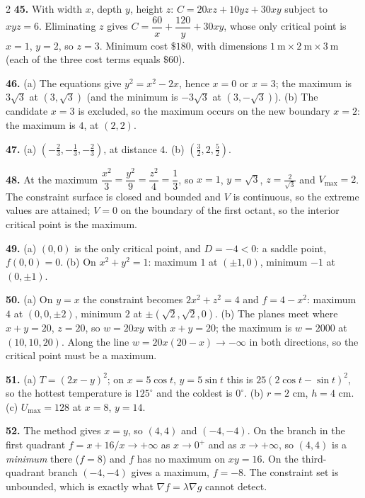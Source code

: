 \documentclass[11pt,oneside]{article}
\newcommand{\grad}{\nabla}
\begin{document}
{\begin{multicols}{2}
\textbf{45.} With width $x$, depth $y$, height $z$: $C=20xz+10yz+30xy$ subject to $xyz=6$.
Eliminating $z$ gives $C=\dfrac{60}{x}+\dfrac{120}{y}+30xy$, whose only critical point is
$x=1$, $y=2$, so $z=3$. Minimum cost $\$180$, with dimensions
$1\ \text{m}\times2\ \text{m}\times3\ \text{m}$ (each of the three cost terms equals $\$60$).

\textbf{46.} (a) The equations give $y^{2}=x^{2}-2x$, hence $x=0$ or $x=3$; the maximum is
$3\sqrt3$ at $\left(3,\sqrt3\right)$ (and the minimum is $-3\sqrt3$ at
$\left(3,-\sqrt3\right)$).\quad
(b) The candidate $x=3$ is excluded, so the maximum occurs on the new boundary $x=2$: the
maximum is $4$, at $(2,2)$.

\textbf{47.} (a) $\left(-\tfrac23,-\tfrac13,-\tfrac23\right)$, at distance $4$.\quad
(b) $\left(\tfrac32,2,\tfrac52\right)$.

\textbf{48.} At the maximum $\dfrac{x^{2}}{3}=\dfrac{y^{2}}{9}=\dfrac{z^{2}}{4}=\dfrac13$, so
$x=1$, $y=\sqrt3$, $z=\tfrac{2}{\sqrt3}$ and $V_{\max}=2$. The constraint surface is closed and
bounded and $V$ is continuous, so the extreme values are attained; $V=0$ on the boundary of the
first octant, so the interior critical point is the maximum.

\textbf{49.} (a) $(0,0)$ is the only critical point, and $D=-4<0$: a saddle point, $f(0,0)=0$.\quad
(b) On $x^{2}+y^{2}=1$: maximum $1$ at $(\pm1,0)$, minimum $-1$ at $(0,\pm1)$.

\textbf{50.} (a) On $y=x$ the constraint becomes $2x^{2}+z^{2}=4$ and $f=4-x^{2}$: maximum $4$
at $(0,0,\pm2)$, minimum $2$ at $\pm\left(\sqrt2,\sqrt2,0\right)$.\quad
(b) The planes meet where $x+y=20$, $z=20$, so $w=20xy$ with $x+y=20$; the maximum is
$w=2000$ at $(10,10,20)$. Along the line $w=20x(20-x)\to-\infty$ in both directions, so the
critical point must be a maximum.

\textbf{51.} (a) $T=(2x-y)^{2}$; on $x=5\cos t$, $y=5\sin t$ this is
$25(2\cos t-\sin t)^{2}$, so the hottest temperature is $125^{\circ}$ and the coldest is
$0^{\circ}$.\quad
(b) $r=2$ cm, $h=4$ cm.\quad
(c) $U_{\max}=128$ at $x=8$, $y=14$.

\textbf{52.} The method gives $x=y$, so $(4,4)$ and $(-4,-4)$. On the branch in the first
quadrant $f=x+16/x\to+\infty$ as $x\to0^{+}$ and as $x\to+\infty$, so $(4,4)$ is a
\emph{minimum} there ($f=8$) and $f$ has no maximum on $xy=16$. On the third-quadrant branch
$(-4,-4)$ gives a maximum, $f=-8$. The constraint set is unbounded, which is exactly what
$\grad f=\lambda\grad g$ cannot detect.


\end{multicols}}
\end{document}
